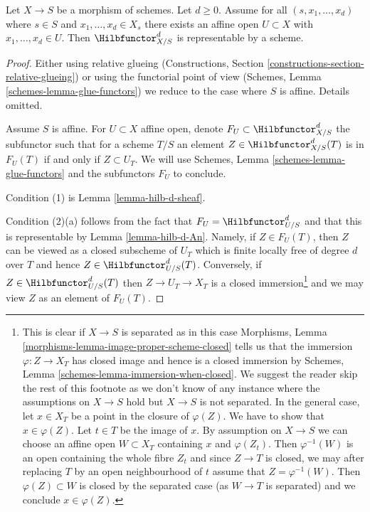 \begin{proposition}
\label{proposition-hilb-d-representable}
Let $X \to S$ be a morphism of schemes. Let $d \geq 0$. Assume
for all $(s, x_1, \ldots, x_d)$ where $s \in S$ and
$x_1, \ldots, x_d \in X_s$ there exists an affine open $U \subset X$
with $x_1, \ldots, x_d \in U$. Then $\Hilbfunctor^d_{X/S}$ is
representable by a scheme.
\end{proposition}

\begin{proof}
Either using relative glueing (Constructions, Section
\ref{constructions-section-relative-glueing}) or using
the functorial point of view
(Schemes, Lemma \ref{schemes-lemma-glue-functors})
we reduce to the case where $S$ is affine. Details omitted.

\medskip\noindent
Assume $S$ is affine. For $U \subset X$ affine open, denote
$F_U \subset \Hilbfunctor^d_{X/S}$ the subfunctor such that
for a scheme $T/S$ an element $Z \in \Hilbfunctor^d_{X/S}(T)$
is in $F_U(T)$ if and only if $Z \subset U_T$. We will use
Schemes, Lemma \ref{schemes-lemma-glue-functors}
and the subfunctors $F_U$ to conclude.

\medskip\noindent
Condition (1) is Lemma \ref{lemma-hilb-d-sheaf}.

\medskip\noindent
Condition (2)(a) follows from the fact that $F_U = \Hilbfunctor^d_{U/S}$
and that this is representable by Lemma \ref{lemma-hilb-d-An}.
Namely, if $Z \in F_U(T)$, then $Z$ can be viewed as a closed subscheme
of $U_T$ which is finite locally free of degree $d$ over $T$ and hence
$Z \in \Hilbfunctor^d_{U/S}(T)$. Conversely, if $Z \in \Hilbfunctor^d_{U/S}(T)$
then $Z \to U_T \to X_T$ is a closed immersion\footnote{This is clear
if $X \to S$ is separated as in this case Morphisms, Lemma
\ref{morphisms-lemma-image-proper-scheme-closed}
tells us that the immersion $\varphi : Z \to X_T$ has closed image
and hence is a closed immersion by
Schemes, Lemma \ref{schemes-lemma-immersion-when-closed}. We suggest the
reader skip the rest of this footnote as we don't know of any instance
where the assumptions on $X \to S$ hold but $X \to S$ is not separated.
In the general case, let $x \in X_T$ be a point in the closure of
$\varphi(Z)$. We have to show that $x \in \varphi(Z)$. Let $t \in T$ be the
image of $x$. By assumption on $X \to S$ we can choose an affine open
$W \subset X_T$ containing $x$ and $\varphi(Z_t)$. Then $\varphi^{-1}(W)$
is an open containing the whole fibre $Z_t$ and since $Z \to T$ is closed,
we may after replacing $T$ by an open neighbourhood of $t$ assume that
$Z = \varphi^{-1}(W)$. Then $\varphi(Z) \subset W$ is closed by the
separated case (as $W \to T$ is separated) and we conclude $x \in \varphi(Z)$.}
and we may view $Z$ as an element of $F_U(T)$.


\end{proof}
